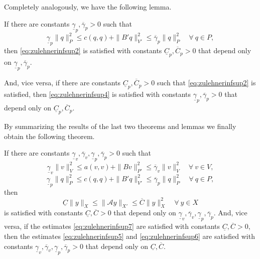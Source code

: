 Completely analogously, we have the following lemma.
\begin{lemma}
If there are constants $\underline{\gamma}_p, \overline{\gamma}_p>0$ such that
\begin{equation}\label{eq:zulehnerinfsup4}
\underline{\gamma}_p\|q\|_P^2\leq c(q,q)+\|B'q\|_{V'}^2\leq\overline{\gamma}_p\|q\|_P^2\quad\forall~q\in P,
\end{equation}
then \eqref{eq:zulehnerinfsup2} is satisfied with constants $\underline{C}_p, \overline{C}_p>0$ that depend only on $\underline{\gamma}_p, \overline{\gamma}_p$.

And, vice versa, if there are constants $\underline{C}_p, \overline{C}_p>0$ such that \eqref{eq:zulehnerinfsup2} is satisfied, then \eqref{eq:zulehnerinfsup4} is satisfied with constants $\underline{\gamma}_p, \overline{\gamma}_p>0$ that depend only on $\underline{C}_p, \overline{C}_p$.
\end{lemma}

By summarizing the results of the last two theorems and lemmas we finally obtain the following theorem.
\begin{theorem}
If there are constants $\underline{\gamma}_v, \overline{\gamma}_v, \underline{\gamma}_p, \overline{\gamma}_p>0$ such that 
\begin{equation}\label{eq:zulehnerinfsup5}
\underline{\gamma}_v\|v\|_V^2\leq a(v,v)+\|Bv\|_{P'}^2\leq\overline{\gamma}_v\|v\|_V^2\quad\forall~v\in V,
\end{equation}
\begin{equation}\label{eq:zulehnerinfsup6}
\underline{\gamma}_p\|q\|_P^2\leq c(q,q)+\|B'q\|_{V'}^2\leq\overline{\gamma}_p\|q\|_P^2\quad\forall~q\in P,
\end{equation}
then
\begin{equation}\label{eq:zulehnerinfsup7}
\underline{C}\|y\|_X\leq \|\mathcal A y\|_{X'}\leq\overline{C}\|y\|_X^2\quad\forall~y\in X
\end{equation}
is satisfied with constants $\underline{C}, \overline{C} > 0$ that depend only on $\underline{\gamma}_v, \overline{\gamma}_v, \underline{\gamma}_p, \overline{\gamma}_p$. And, vice versa, if
the estimates \eqref{eq:zulehnerinfsup7} are satisfied with constants $\underline{C}, \overline{C} > 0$, then the estimates \eqref{eq:zulehnerinfsup5} and \eqref{eq:zulehnerinfsup6} are satisfied with constants
$\underline{\gamma}_v, \overline{\gamma}_v, \underline{\gamma}_p, \overline{\gamma}_p>0$ that depend only on $\underline{C}, \overline{C}$.
\end{theorem}

